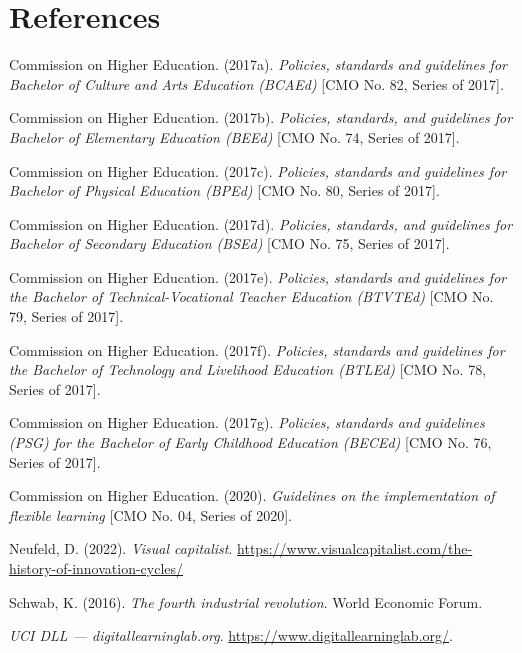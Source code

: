 \documentclass[
  12pt,
  foliopaper,
  DIV=11,
  numbers=noendperiod]{scrartcl}
\newlength{\cslhangindent}
\newlength{\cslentryspacingunit} %
\newenvironment{CSLReferences}[2] %
 {%
  \setlength{\parindent}{0pt}
  \ifodd #1
  \let\oldpar\par
  \def\par{\hangindent=\cslhangindent\oldpar}
  \fi
  \setlength{\parskip}{#2\cslentryspacingunit}
 }%
 {}
\begin{document}
\newpage{}

\hypertarget{references}{%
\section*{References}\label{references}}

\hypertarget{refs}{}
\begin{CSLReferences}{1}{0}
\leavevmode{}%
Commission on Higher Education. (2017a). \emph{Policies, standards and
guidelines for {Bachelor of Culture and Arts Education (BCAEd)}} {[}CMO
No. 82, Series of 2017{]}.

\leavevmode{}%
Commission on Higher Education. (2017b). \emph{Policies, standards, and
guidelines for {Bachelor of Elementary Education (BEEd)}} {[}CMO No. 74,
Series of 2017{]}.

\leavevmode{}%
Commission on Higher Education. (2017c). \emph{Policies, standards and
guidelines for {Bachelor of Physical Education (BPEd)}} {[}CMO No. 80,
Series of 2017{]}.

\leavevmode{}%
Commission on Higher Education. (2017d). \emph{Policies, standards, and
guidelines for {Bachelor of Secondary Education (BSEd)}} {[}CMO No. 75,
Series of 2017{]}.

\leavevmode{}%
Commission on Higher Education. (2017e). \emph{Policies, standards and
guidelines for the {Bachelor of Technical-Vocational Teacher Education
(BTVTEd)}} {[}CMO No. 79, Series of 2017{]}.

\leavevmode{}%
Commission on Higher Education. (2017f). \emph{Policies, standards and
guidelines for the {Bachelor of Technology and Livelihood Education
(BTLEd)}} {[}CMO No. 78, Series of 2017{]}.

\leavevmode{}%
Commission on Higher Education. (2017g). \emph{Policies, standards and
guidelines {(PSG)} for the {Bachelor of Early Childhood Education
(BECEd)}} {[}CMO No. 76, Series of 2017{]}.

\leavevmode{}%
Commission on Higher Education. (2020). \emph{Guidelines on the
implementation of flexible learning} {[}CMO No. 04, Series of 2020{]}.

\leavevmode{}%
Neufeld, D. (2022). \emph{Visual capitalist}.
\url{https://www.visualcapitalist.com/the-history-of-innovation-cycles/}

\leavevmode{}%
Schwab, K. (2016). \emph{The fourth industrial revolution}. World
Economic Forum.

\leavevmode{}%
\emph{{U}{C}{I} {D}{L}{L} --- digitallearninglab.org}.
\url{https://www.digitallearninglab.org/}.

\end{CSLReferences}
\end{document}
